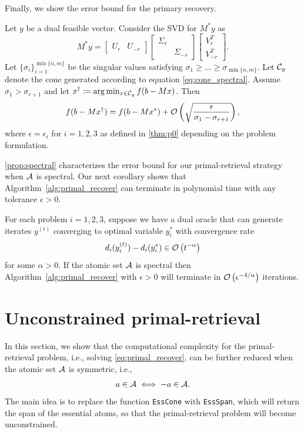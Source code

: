 Finally, we show the error bound for the primary recovery. 
\begin{proposition} \label{prop:spectral}
     Let $y$ be a dual feasible vector. Consider the SVD for $M^*y$ as 
     \[ M^*y = 
\begin{bmatrix}
    U_r & U_{-r}
\end{bmatrix}
\begin{bmatrix}
    \Sigma_r &          \\ 
             &  \Sigma_{-r}
\end{bmatrix}
\begin{bmatrix}
    V_r^T \\ 
    V_{-r}^T
\end{bmatrix}.
\] 
Let $\{\sigma_i\}_{i=1}^{\min\{n,m\}}$ be the singular values satisfying 
$\sigma_1 \geq \dots \geq \sigma_{\min\{n,m\}}$.
Let $\mathcal{C}_y$ denote the cone generated according to equation \eqref{eq:cone_spectral}. Assume $\sigma_1 > \sigma_{r+1}$ and let $x^\dagger \coloneqq \arg\min_{ x \in \mathcal{C}_y } f(b - Mx)$. Then
\[
    f( b - M x^\dagger ) = f( b - M x^* ) + \mathcal{O}\left( \sqrt{ \frac{\epsilon}{ \sigma_1 - \sigma_{r+1} } } \right),
\]
where $\epsilon = \epsilon_i$ for $i = 1, 2, 3$ as defined in \autoref{thm:p0} depending on the problem formulation.
\end{proposition}

\autoref{prop:spectral} characterizes the error bound for our primal-retrieval strategy when $\mathcal{A}$ is spectral. Our next corollary shows that Algorithm~\ref{alg:primal_recover} can terminate in polynomial time with any tolerance $\epsilon > 0$.

\begin{corollary} \label{coro:spectral}
    For each problem $i= 1, 2, 3$, suppose we have a dual oracle that can generate iterates $y^{(t)}$ converging to optimal variable $y_i^*$ with convergence rate
    \[d_i(y_i^{(t)}) - d_i(y_i^*) \in \mathcal{O}\left( t^{-\alpha} \right)\]
    for some $\alpha > 0$. If the atomic set $\mathcal{A}$ is spectral then Algorithm~\ref{alg:primal_recover} with $\epsilon>0$ will terminate in $\mathcal{O}\left(\epsilon^{-4/\alpha}\right)$ iterations. 
\end{corollary}

\section{Unconstrained primal-retrieval}
In this section, we show that the computational complexity for the primal-retrieval problem, i.e., solving \eqref{eq:primal_recover}, can be further reduced when the atomic set $\mathcal{A}$ is symmetric, i.e., 
\[a\in\mathcal{A} \iff -a\in\mathcal{A}.\]
The main idea is to replace the function \texttt{EssCone} with \texttt{EssSpan}, which will return the span of the essential atoms, so that the primal-retrieval problem will become unconstrained. 

